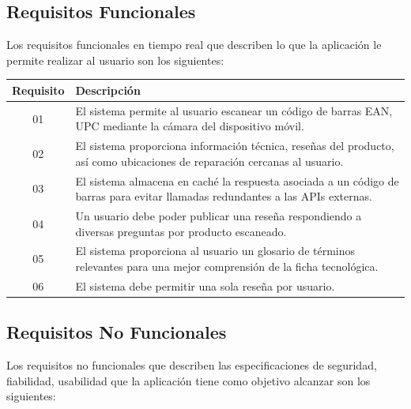 \subsection{Requisitos Funcionales}

Los requisitos funcionales en tiempo real que describen lo que la aplicación
le permite realizar al usuario son los siguientes:

\begin{center}
\begin{tabular}{c p{12cm}}
\toprule
\textbf{Requisito} & \textbf{Descripción} \\
\midrule
01 & El sistema permite al usuario escanear un código de barras EAN, UPC
     mediante la cámara del dispositivo móvil. \\[6pt]

02 & El sistema proporciona información técnica, reseñas del producto, así como
     ubicaciones de reparación cercanas al usuario. \\[6pt]

03 & El sistema almacena en caché la respuesta asociada a un código de barras
     para evitar llamadas redundantes a las APIs externas. \\[6pt]

04 & Un usuario debe poder publicar una reseña respondiendo a diversas preguntas
     por producto escaneado. \\[6pt]

05 & El sistema proporciona al usuario un glosario de términos relevantes para
     una mejor comprensión de la ficha tecnológica. \\[6pt]

06 & El sistema debe permitir una sola reseña por usuario. \\[6pt]
\bottomrule
\end{tabular}
\end{center}

\subsection{Requisitos No Funcionales}
Los requisitos no funcionales que describen las especificaciones de seguridad, fiabilidad, usabilidad que
la aplicación tiene como objetivo alcanzar son los siguientes:

